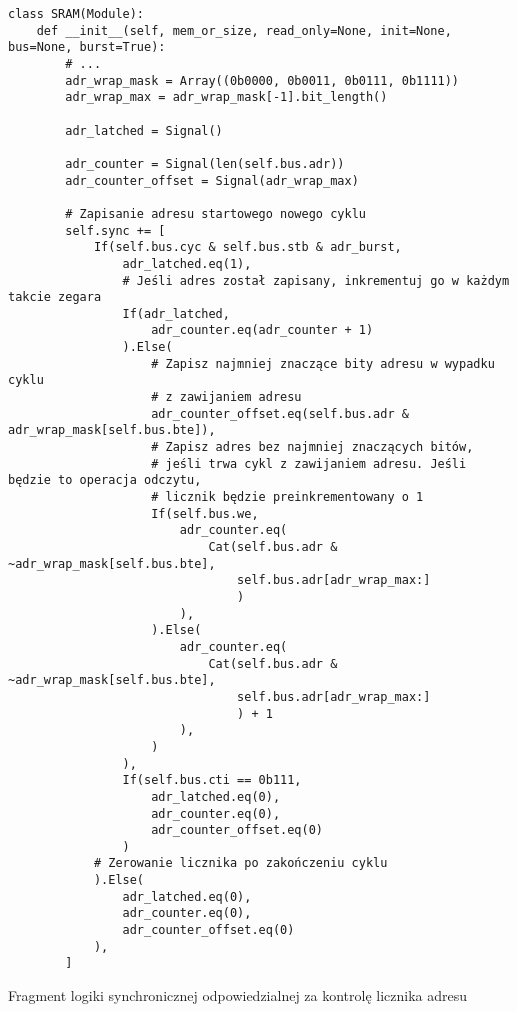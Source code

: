 \begin{longlisting}
\begin{verbatim}
class SRAM(Module):
    def __init__(self, mem_or_size, read_only=None, init=None, bus=None, burst=True):
        # ...
        adr_wrap_mask = Array((0b0000, 0b0011, 0b0111, 0b1111))
        adr_wrap_max = adr_wrap_mask[-1].bit_length()

        adr_latched = Signal()

        adr_counter = Signal(len(self.bus.adr))
        adr_counter_offset = Signal(adr_wrap_max)

        # Zapisanie adresu startowego nowego cyklu
        self.sync += [
            If(self.bus.cyc & self.bus.stb & adr_burst,
                adr_latched.eq(1),
                # Jeśli adres został zapisany, inkrementuj go w każdym takcie zegara
                If(adr_latched,
                    adr_counter.eq(adr_counter + 1)
                ).Else(
                    # Zapisz najmniej znaczące bity adresu w wypadku cyklu
                    # z zawijaniem adresu
                    adr_counter_offset.eq(self.bus.adr & adr_wrap_mask[self.bus.bte]),
                    # Zapisz adres bez najmniej znaczących bitów,
                    # jeśli trwa cykl z zawijaniem adresu. Jeśli będzie to operacja odczytu,
                    # licznik będzie preinkrementowany o 1
                    If(self.bus.we,
                        adr_counter.eq(
                            Cat(self.bus.adr & ~adr_wrap_mask[self.bus.bte],
                                self.bus.adr[adr_wrap_max:]
                                )
                        ),
                    ).Else(
                        adr_counter.eq(
                            Cat(self.bus.adr & ~adr_wrap_mask[self.bus.bte],
                                self.bus.adr[adr_wrap_max:]
                                ) + 1
                        ),
                    )
                ),
                If(self.bus.cti == 0b111,
                    adr_latched.eq(0),
                    adr_counter.eq(0),
                    adr_counter_offset.eq(0)
                )
            # Zerowanie licznika po zakończeniu cyklu
            ).Else(
                adr_latched.eq(0),
                adr_counter.eq(0),
                adr_counter_offset.eq(0)
            ),
        ]
\end{verbatim}
\caption{\label{lst:impl-sram-adrcounter}Fragment logiki synchronicznej odpowiedzialnej za kontrolę licznika adresu}
\end{longlisting}

